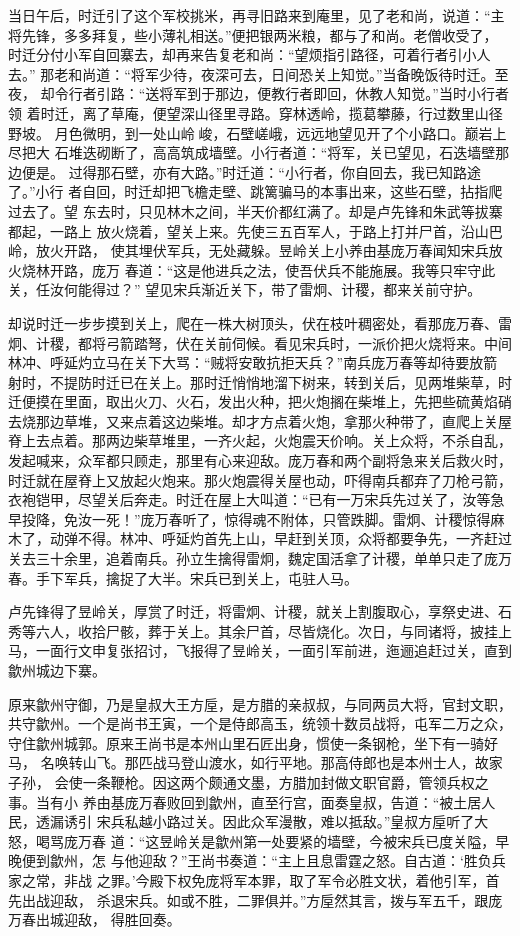 当日午后，时迁引了这个军校挑米，再寻旧路来到庵里，见了老和尚，说道：“主
将先锋，多多拜复，些小薄礼相送。”便把银两米粮，都与了和尚。老僧收受了，
时迁分付小军自回寨去，却再来告复老和尚：“望烦指引路径，可着行者引小人去。”
那老和尚道：“将军少待，夜深可去，日间恐关上知觉。”当备晚饭待时迁。至夜，
却令行者引路：“送将军到于那边，便教行者即回，休教人知觉。”当时小行者领
着时迁，离了草庵，便望深山径里寻路。穿林透岭，揽葛攀藤，行过数里山径野坡。
月色微明，到一处山岭峻，石壁嵯峨，远远地望见开了个小路口。巅岩上尽把大
石堆迭砌断了，高高筑成墙壁。小行者道：“将军，关已望见，石迭墙壁那边便是。
过得那石壁，亦有大路。”时迁道：“小行者，你自回去，我已知路途了。”小行
者自回，时迁却把飞檐走壁、跳篱骗马的本事出来，这些石壁，拈指爬过去了。望
东去时，只见林木之间，半天价都红满了。却是卢先锋和朱武等拔寨都起，一路上
放火烧着，望关上来。先使三五百军人，于路上打并尸首，沿山巴岭，放火开路，
使其埋伏军兵，无处藏躲。昱岭关上小养由基庞万春闻知宋兵放火烧林开路，庞万
春道：“这是他进兵之法，使吾伏兵不能施展。我等只牢守此关，任汝何能得过？”
望见宋兵渐近关下，带了雷炯、计稷，都来关前守护。

却说时迁一步步摸到关上，爬在一株大树顶头，伏在枝叶稠密处，看那庞万春、雷
炯、计稷，都将弓箭踏弩，伏在关前伺候。看见宋兵时，一派价把火烧将来。中间
林冲、呼延灼立马在关下大骂：“贼将安敢抗拒天兵？”南兵庞万春等却待要放箭
射时，不提防时迁已在关上。那时迁悄悄地溜下树来，转到关后，见两堆柴草，时
迁便摸在里面，取出火刀、火石，发出火种，把火炮搁在柴堆上，先把些硫黄焰硝
去烧那边草堆，又来点着这边柴堆。却才方点着火炮，拿那火种带了，直爬上关屋
脊上去点着。那两边柴草堆里，一齐火起，火炮震天价响。关上众将，不杀自乱，
发起喊来，众军都只顾走，那里有心来迎敌。庞万春和两个副将急来关后救火时，
时迁就在屋脊上又放起火炮来。那火炮震得关屋也动，吓得南兵都弃了刀枪弓箭，
衣袍铠甲，尽望关后奔走。时迁在屋上大叫道：“已有一万宋兵先过关了，汝等急
早投降，免汝一死！”庞万春听了，惊得魂不附体，只管跌脚。雷炯、计稷惊得麻
木了，动弹不得。林冲、呼延灼首先上山，早赶到关顶，众将都要争先，一齐赶过
关去三十余里，追着南兵。孙立生擒得雷炯，魏定国活拿了计稷，单单只走了庞万
春。手下军兵，擒捉了大半。宋兵已到关上，屯驻人马。

卢先锋得了昱岭关，厚赏了时迁，将雷炯、计稷，就关上割腹取心，享祭史进、石
秀等六人，收拾尸骸，葬于关上。其余尸首，尽皆烧化。次日，与同诸将，披挂上
马，一面行文申复张招讨，飞报得了昱岭关，一面引军前进，迤逦追赶过关，直到
歙州城边下寨。

原来歙州守御，乃是皇叔大王方垕，是方腊的亲叔叔，与同两员大将，官封文职，
共守歙州。一个是尚书王寅，一个是侍郎高玉，统领十数员战将，屯军二万之众，
守住歙州城郭。原来王尚书是本州山里石匠出身，惯使一条钢枪，坐下有一骑好马，
名唤转山飞。那匹战马登山渡水，如行平地。那高侍郎也是本州士人，故家子孙，
会使一条鞭枪。因这两个颇通文墨，方腊加封做文职官爵，管领兵权之事。当有小
养由基庞万春败回到歙州，直至行宫，面奏皇叔，告道：“被土居人民，透漏诱引
宋兵私越小路过关。因此众军漫散，难以抵敌。”皇叔方垕听了大怒，喝骂庞万春
道：“这昱岭关是歙州第一处要紧的墙壁，今被宋兵已度关隘，早晚便到歙州，怎
与他迎敌？”王尚书奏道：“主上且息雷霆之怒。自古道：‘胜负兵家之常，非战
之罪。’今殿下权免庞将军本罪，取了军令必胜文状，着他引军，首先出战迎敌，
杀退宋兵。如或不胜，二罪俱并。”方垕然其言，拨与军五千，跟庞万春出城迎敌，
得胜回奏。

